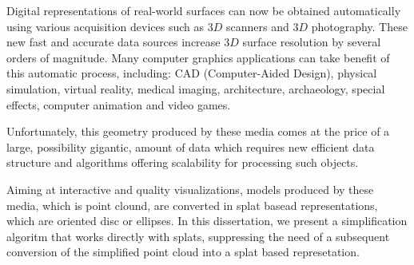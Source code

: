 \begin{foreignabstract}
Digital representations of real-world surfaces can now be obtained
automatically using various acquisition devices such as $3D$ scanners and $3D$
photography. These new fast and accurate data sources increase $3D$ surface
resolution by several orders of magnitude. Many computer graphics applications
can take benefit of this automatic process, including: CAD (Computer-Aided
Design), physical simulation, virtual reality, medical imaging, architecture,
archaeology, special effects, computer animation and video games.

Unfortunately, this geometry produced by these media comes at the price of a
large, possibility gigantic, amount of data which requires new efficient data
structure and algorithms offering scalability for processing such objects.

Aiming at interactive and quality visualizations, models produced by these media,
which is point clound, are converted in splat basead representations, which are
oriented disc or ellipses. In this dissertation, we present a
simplification algoritm that works directly with splats, suppressing the need of
a subsequent conversion of the simplified point cloud into a splat based represetation.


\end{foreignabstract}

